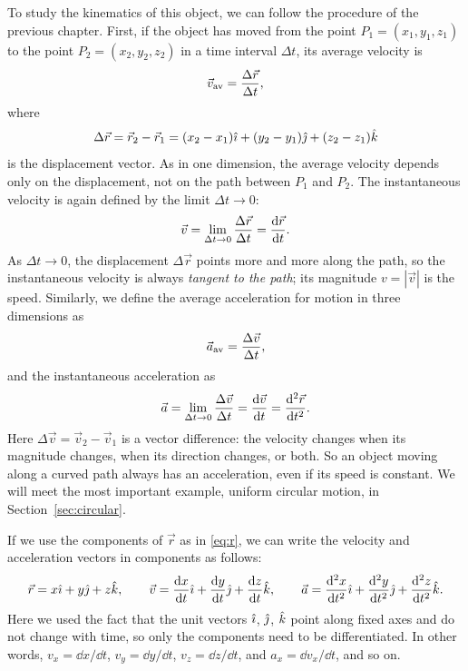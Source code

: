 \documentclass[11pt,a4paper]{article}
\begin{document}
To study the kinematics of this object, we can follow the procedure of the previous chapter. First,
if the object has moved from the point $P_1 = (x_1, y_1, z_1)$ to the point $P_2 = (x_2, y_2, z_2)$
in a time interval $\Delta t$, its average velocity is
\begin{equation}\label{eq:vav3}
  \vec{v}_{\mathrm{av}} = \frac{\Delta\vec{r}}{\Delta t} ,
\end{equation}
where
\begin{equation}\label{eq:dr}
  \Delta\vec{r} = \vec{r}_2 - \vec{r}_1 = (x_2 - x_1)\hat{\imath} + (y_2 - y_1)\hat{\jmath} + (z_2 - z_1)\hat{k}
\end{equation}
is the displacement vector. As in one dimension, the average velocity depends only on the
displacement, not on the path between $P_1$ and $P_2$. The instantaneous velocity is again defined
by the limit $\Delta t\to 0$:
\begin{equation}\label{eq:v3}
  \vec{v} = \lim_{\Delta t\to 0}\frac{\Delta\vec{r}}{\Delta t} = \frac{\mathrm{d} \vec{r}}{\mathrm{d} t} .
\end{equation}
As $\Delta t \to 0$, the displacement $\Delta\vec{r}$ points more and more along the path, so the
instantaneous velocity is always \emph{tangent to the path}; its magnitude $v = |\vec{v}|$ is the
speed. Similarly, we define the average acceleration for motion in three dimensions as
\begin{equation}\label{eq:aav3}
  \vec{a}_{\mathrm{av}} = \frac{\Delta\vec{v}}{\Delta t} ,
\end{equation}
and the instantaneous acceleration as
\begin{equation}\label{eq:a3}
  \vec{a} = \lim_{\Delta t\to 0}\frac{\Delta\vec{v}}{\Delta t} = \frac{\mathrm{d} \vec{v}}{\mathrm{d} t}
          = \frac{\mathrm{d}^2\vec{r}}{\mathrm{d} t^2} .
\end{equation}
Here $\Delta\vec{v} = \vec{v}_2 - \vec{v}_1$ is a vector difference: the velocity changes when its
magnitude changes, when its direction changes, or both. So an object moving along a curved path
always has an acceleration, even if its speed is constant. We will meet the most important example,
uniform circular motion, in Section~\ref{sec:circular}.

If we use the components of $\vec{r}$ as in \eqref{eq:r}, we can write the velocity and
acceleration vectors in components as follows:
\begin{equation}\label{eq:components3}
  \vec{r} = x\hat{\imath} + y\hat{\jmath} + z\hat{k} , \qquad
  \vec{v} = \frac{\mathrm{d} x}{\mathrm{d} t}\hat{\imath} + \frac{\mathrm{d} y}{\mathrm{d} t}\hat{\jmath} + \frac{\mathrm{d} z}{\mathrm{d} t}\hat{k} , \qquad
  \vec{a} = \frac{\mathrm{d}^2x}{\mathrm{d} t^2}\hat{\imath} + \frac{\mathrm{d}^2y}{\mathrm{d} t^2}\hat{\jmath} + \frac{\mathrm{d}^2z}{\mathrm{d} t^2}\hat{k} .
\end{equation}
Here we used the fact that the unit vectors $\hat{\imath}$, $\hat{\jmath}$, $\hat{k}$ point along fixed axes and do
not change with time, so only the components need to be differentiated. In other words,
$v_x = \dd x/\dd t$, $v_y = \dd y/\dd t$, $v_z = \dd z/\dd t$, and $a_x = \dd v_x/\dd t$, and so on.
\end{document}
